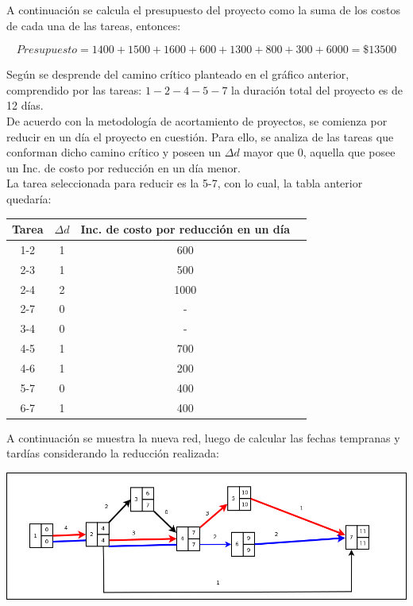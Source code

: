 \documentclass[a4paper,10pt]{article}
\begin{document}
A continuaci\'on se calcula el presupuesto del proyecto como la suma de los costos de cada una de las tareas, entonces:

$$ Presupuesto = 1400 + 1500 + 1600 + 600 + 1300 + 800 + 300 + 6000 = \$13500$$

Seg\'un se desprende del camino cr\'itico planteado en el gr\'afico anterior, comprendido por las tareas: $1-2-4-5-7$ la duraci\'on total del proyecto es de 12 d\'ias.
\\
De acuerdo con la metodolog\'ia de acortamiento de proyectos, se comienza por reducir en un d\'ia el proyecto en cuesti\'on. Para ello, se analiza de las tareas que conforman dicho camino cr\'itico 
y poseen un $\Delta d$ mayor que 0, aquella que posee un Inc. de costo por reducci\'on en un d\'ia menor.\\

La tarea seleccionada para reducir es la 5-7, con lo cual, la tabla anterior quedar\'ia:


   \begin{center}
   \begin{tabular}{|| c | c | c | c ||}
   \hline 
      Tarea & $\Delta d$ & Inc. de costo por reducci\'on en un d\'ia \\ \hline \hline
      1-2 & 1 & 600  \\ \hline
      2-3 & 1 & 500  \\ \hline 
      2-4 & 2 & 1000  \\ \hline
      2-7 & 0 & - \\ \hline
      3-4 & 0 & - \\ \hline
      4-5 & 1 & 700 \\ \hline
      4-6 & 1 & 200 \\ \hline
      5-7 & 0 & 400    \\ \hline
      6-7 & 1 & 400\\ \hline
   \end{tabular}
   \end{center}

A continuaci\'on se muestra la nueva red, luego de calcular las fechas tempranas y tard\'ias considerando la reducci\'on realizada:

  \begin{center}
    \includegraphics[scale=0.4,keepaspectratio=true]{img/ej5-1red.png} 
  \end{center}
\end{document}
